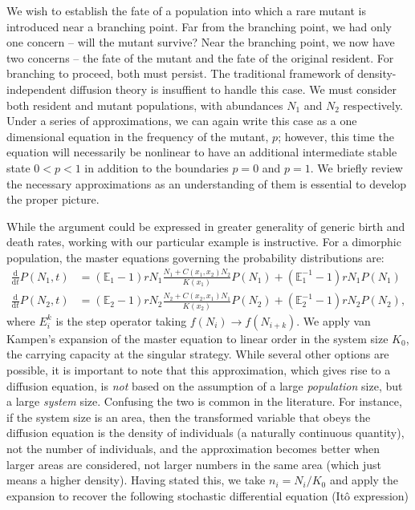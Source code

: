 \documentclass[letterpaper,10pt]{article}
\title{}
\author{Carl Boettiger}
\newcommand{\ud}{\mathrm{d}}
\newcommand{\E}{\mathbb{E}}
\begin{document}
\maketitle
We wish to establish the fate of a population into which a rare mutant is introduced near a branching point.  Far from the branching point, we had only one concern -- will the mutant survive?  Near the branching point, we now have two concerns -- the fate of the mutant and the fate of the original resident.  For branching to proceed, both must persist.  The traditional framework of density-independent diffusion theory is insuffient to handle this case.  We must consider both resident and mutant populations, with abundances $N_1$ and $N_2$ respectively.  Under a series of approximations, we can again write this case as a one dimensional equation in the frequency of the mutant, $p$; however, this time the equation will necessarily be nonlinear to have an additional intermediate stable state $0<p<1$ in addition to the boundaries $p=0$ and $p=1$.  We briefly review the necessary approximations as an understanding of them is essential to develop the proper picture.   

While the argument could be expressed in greater generality of generic birth and death rates, working with our particular example is instructive.  For a dimorphic population, the master equations governing the probability distributions are:
\begin{align}
\frac{\ud}{\ud t} P(N_1,t) &= (\E_1 - 1) r N_1 \frac{N_1 + C(x_1, x_2) N_2}{K(x_1) }P(N_1) + (\E_1^{-1} - 1)r N_1 P(N_1) \nonumber \\
\frac{\ud}{\ud t} P(N_2,t) &= (\E_2 - 1) r N_2 \frac{N_2 + C(x_2, x_1) N_1}{K(x_2) }P(N_2) + (\E_2^{-1} - 1)r N_2 P(N_2),
\label{mastereq}
\end{align}
where $E_i^k$ is the step operator taking $f(N_i) \to f(N_{i+k})$.  We apply van Kampen's expansion of the master equation to linear order in the system size $K_0$, the carrying capacity at the singular strategy.  While several other options are possible, it is important to note that this approximation, which gives rise to a diffusion equation, is \emph{not} based on the assumption of a large \emph{population} size, but a large \emph{system} size.  Confusing the two is common in the literature.  For instance, if the system size is an area, then the transformed variable that obeys the diffusion equation is the density of individuals (a naturally continuous quantity), not the number of individuals, and the approximation becomes better when larger areas are considered, not larger numbers in the same area (which just means a higher density).  Having stated this, we take $n_i = N_i/K_0$ and apply the expansion to recover the following stochastic differential equation (It\^o expression)
\end{document}
